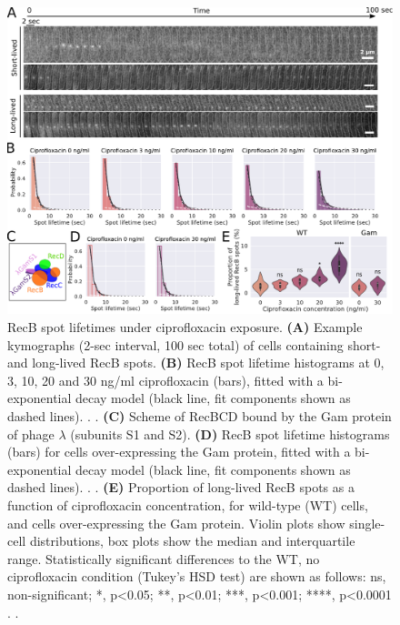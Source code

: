 \begin{figure}[htbp]
    \centering
    \includegraphics[width=.8\textwidth]{Figures/Fig2_RecB_lifetime.pdf}
    \caption{RecB spot lifetimes under ciprofloxacin exposure. \textbf{(A)} Example kymographs (2-sec interval, 100 sec total) of cells containing short- and long-lived RecB spots. \textbf{(B)} RecB spot lifetime histograms at 0, 3, 10, 20 and 30 ng/ml ciprofloxacin (bars), fitted with a bi-exponential decay model (black line, fit components shown as dashed lines). . . \textbf{(C)} Scheme of RecBCD bound by the Gam protein of phage $\lambda$ (subunits S1 and S2). \textbf{(D)} RecB spot lifetime histograms (bars) for cells over-expressing the Gam protein, fitted with a bi-exponential decay model (black line, fit components shown as dashed lines). . . \textbf{(E)} Proportion of long-lived RecB spots as a function of ciprofloxacin concentration, for wild-type (WT) cells, and cells over-expressing the Gam protein. Violin plots show single-cell distributions, box plots show the median and interquartile range. Statistically significant differences to the WT, no ciprofloxacin condition (Tukey's HSD test) are shown as follows: ns, non-significant; *, p<0.05; **, p<0.01; ***, p<0.001; ****, p<0.0001 . .}
    \label{Fig:lifetimes}
\end{figure}

